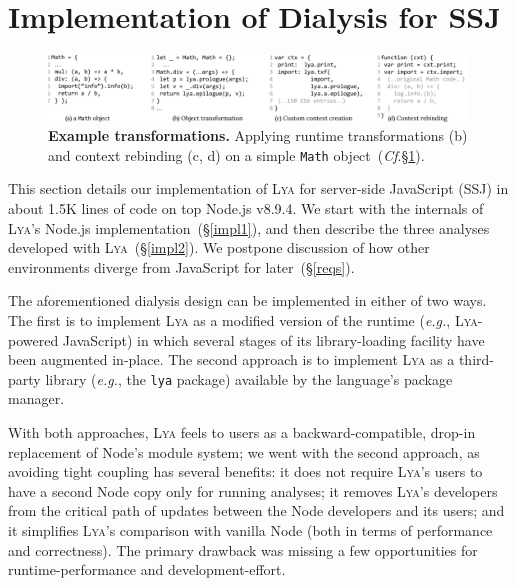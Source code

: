 \documentclass[letterpaper,twocolumn,10pt]{article}
\def\eg{{\em e.g.}, }
\newcommand{\ttt}[1]{\texttt{#1}}
\newcommand{\cf}[1]{(\emph{Cf}.\S\ref{#1})}
\newcommand{\sx}[1]{(\S\ref{#1})}
\newcommand{\sys}{{\scshape Lya}\xspace}
\begin{document}
\section{Implementation of Dialysis for SSJ}
\label{impl}

\begin{figure}[t]
\centering
\includegraphics[width=0.99\textwidth]{./figs/lya_ex2.pdf}
\vspace{-2mm}
\caption{
  \textbf{Example transformations.}
   Applying runtime transformations (b) and context rebinding (c, d) on a simple \ttt{Math} object~\cf{impl}.
}
\label{fig:ex2}
\vspace{-4mm}
\end{figure}


This section details our implementation of \sys for server-side JavaScript (SSJ) in about 1.5K lines of code on top Node.js v8.9.4.
We start with the internals of \sys's Node.js implementation~\sx{impl1}, and then describe the three analyses developed with \sys~\sx{impl2}.
We postpone discussion of how other environments diverge from JavaScript for later~\sx{reqs}.

The aforementioned dialysis design can be implemented in either of two ways.
The first is to implement \sys as a modified version of the runtime (\eg \sys-powered JavaScript) in which several stages of its library-loading facility have been augmented in-place. %
The second approach is to implement \sys as a third-party library (\eg the \ttt{lya} package) available by the language's package manager.

With both approaches, \sys feels to users as a backward-compatible, drop-in replacement of Node's module system;
  we went with the second approach, as avoiding tight coupling has several benefits:
  it does not require \sys's users to have a second Node copy only for running analyses;
  it removes \sys's developers from the critical path of updates between the Node developers and its users; 
  and it simplifies \sys's comparison with vanilla Node (both in terms of performance and correctness).
The primary drawback was missing a few  opportunities for runtime-performance and development-effort.
\end{document}
